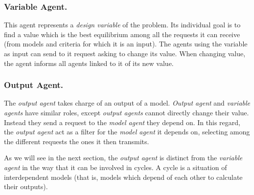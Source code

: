 \subsubsection*{Variable Agent.}

This agent represents a \emph{design variable} of the problem. Its individual goal is to find a value which is the best equilibrium among all the requests it can receive (from models and criteria for which it is an input). The agents using the variable as input can send to it request asking to change its value. When changing value, the agent informs all agents linked to it of its new value. 


\subsubsection*{Output Agent.}
The \emph{output agent} takes charge of an output of a model. \emph{Output agent} and \emph{variable agents} have similar roles, except \emph{output agents} cannot directly change their value. Instead they send a request to the \emph{model agent} they depend on. In this regard, the \emph{output agent} act as a filter for the \emph{model agent} it depends on, selecting among the different requests the ones it then transmits.


As we will see in the next section, the \emph{output agent} is distinct from the \emph{variable agent} in the way that it can be involved in cycles. A cycle is a situation of interdependent models (that is, models which depend of each other to calculate their outputs).

